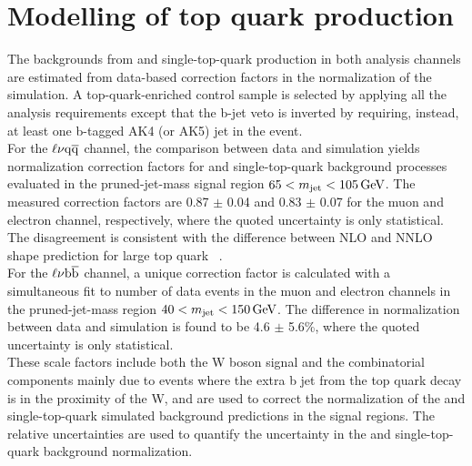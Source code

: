 \section{Modelling of top quark production}\label{sec:ttbar}

The backgrounds from \ttbar and single-top-quark production in both analysis channels are estimated from data-based correction factors in the normalization of the simulation.
A top-quark-enriched control sample is selected by applying all the analysis requirements except that the b-jet veto is inverted by requiring, instead, at least one b-tagged AK4 (or AK5) jet in the event.\\

For the $\ell\nu\mathrm{q}\overline{\mathrm{q}}$ channel, the comparison between data and simulation yields normalization correction factors for \ttbar and single-top-quark background processes evaluated in the pruned-jet-mass signal region
$65 < m_{\text{jet}} < 105\,\text{Ge\hspace{-.08em}V}$. The measured correction factors are 0.87 $\pm$ 0.04 and 0.83 $\pm$ 0.07 for the muon and electron channel, respectively, where the quoted uncertainty is only statistical.
The disagreement is consistent with the difference between NLO and NNLO shape prediction for large top quark \pt~\cite{Czakon:2015owf}.\\

For the $\ell\nu{\mathrm{b}\overline{\mathrm{b}}}$ channel, a unique correction factor is calculated with a simultaneous fit to number of data events in the muon and electron channels in the pruned-jet-mass region $40 < m_{\text{jet}} < 150\,\text{Ge\hspace{-.08em}V}$.
The difference in normalization between data and simulation is found to be 4.6 $\pm$ 5.6\%, where the quoted uncertainty is only statistical. \\

These scale factors include both the W boson signal and the combinatorial components mainly due to events where the extra b jet from the top quark decay is in the proximity of the W, and are used to correct the normalization
of the \ttbar and single-top-quark simulated background predictions in the signal regions. The relative uncertainties are used to quantify the uncertainty in the \ttbar and single-top-quark background normalization.

